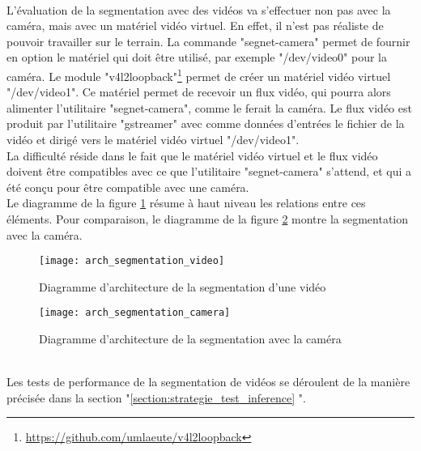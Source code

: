﻿
\vspace{\baselineskip}
\\
\noindent L'évaluation de la segmentation avec des vidéos va s'effectuer non pas avec la caméra, mais avec un matériel vidéo virtuel. En effet, il n'est pas réaliste de pouvoir travailler sur le terrain. La commande "segnet-camera" permet de fournir en option le matériel qui doit être utilisé, par exemple "/dev/video0" pour la caméra. Le module "v4l2loopback"\footnote{\url{https://github.com/umlaeute/v4l2loopback}} permet de créer un matériel vidéo virtuel "/dev/video1". Ce matériel permet de recevoir un flux vidéo, qui pourra alors alimenter l'utilitaire "segnet-camera", comme le ferait la caméra. Le flux vidéo est produit par l'utilitaire "gstreamer" avec comme données d'entrées le fichier de la vidéo et dirigé vers le matériel vidéo virtuel "/dev/video1".
\vspace{\baselineskip}
\\
\noindent La difficulté réside dans le fait que le matériel vidéo virtuel et le flux vidéo doivent être compatibles avec ce que l'utilitaire "segnet-camera" s'attend, et qui a été conçu pour être compatible avec une caméra. 
\vspace{\baselineskip}
\\
\noindent Le diagramme de la figure \ref{fig:arch_segmentation_video} résume à haut niveau les relations entre ces éléments. Pour comparaison, le diagramme de la figure \ref{fig:arch_segmentation_camera} montre la segmentation avec la caméra. 
\begin{figure}[H]
    \centering
    \texttt{[image: arch\_segmentation\_video]}
    \caption[Diagramme d'architecture de la segmentation d'une vidéo]{Diagramme d'architecture de la segmentation d'une vidéo}
    \label{fig:arch_segmentation_video}
\end{figure}
\begin{figure}[H]
    \centering
    \texttt{[image: arch\_segmentation\_camera]}
    \caption[Diagramme d'architecture de la segmentation avec la caméra]{Diagramme d'architecture de la segmentation avec la caméra}
    \label{fig:arch_segmentation_camera}
\end{figure}
\vspace{\baselineskip}
\\
\noindent Les tests de performance de la segmentation de vidéos se déroulent de la manière précisée dans la section "\ref{section:strategie_test_inference} ". 

